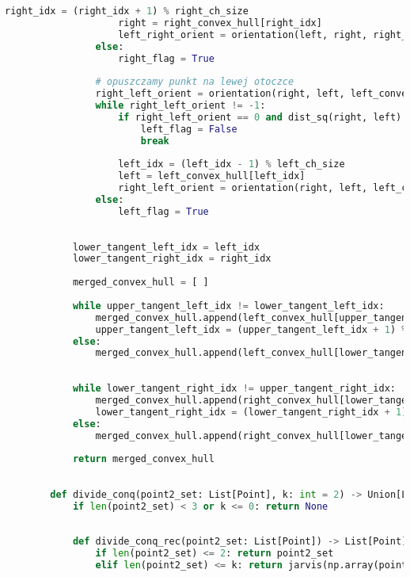 \documentclass[11pt]{article}
\theoremstyle{remark} \newtheorem{definition}{def.}
\theoremstyle{definition} \newtheorem{twierdzenie}{tw.}
\begin{document}
\begin{lstlisting}[language=Python]
                    right_idx = (right_idx + 1) % right_ch_size
                    right = right_convex_hull[right_idx]
                    left_right_orient = orientation(left, right, right_convex_hull[(right_idx + 1) % right_ch_size])
                else:
                    right_flag = True
                    
                # opuszczamy punkt na lewej otoczce
                right_left_orient = orientation(right, left, left_convex_hull[(left_idx - 1) % left_ch_size])
                while right_left_orient != -1:
                    if right_left_orient == 0 and dist_sq(right, left) >= dist_sq(right, left_convex_hull[(left_idx - 1) % left_ch_size]):
                        left_flag = False
                        break
                            
                    left_idx = (left_idx - 1) % left_ch_size
                    left = left_convex_hull[left_idx]
                    right_left_orient = orientation(right, left, left_convex_hull[(left_idx - 1) % left_ch_size])
                else:
                    left_flag = True
                    
                    
            lower_tangent_left_idx = left_idx
            lower_tangent_right_idx = right_idx
            
            merged_convex_hull = [ ]
        
            while upper_tangent_left_idx != lower_tangent_left_idx:
                merged_convex_hull.append(left_convex_hull[upper_tangent_left_idx])
                upper_tangent_left_idx = (upper_tangent_left_idx + 1) % left_ch_size
            else:
                merged_convex_hull.append(left_convex_hull[lower_tangent_left_idx])
                
                
            while lower_tangent_right_idx != upper_tangent_right_idx:
                merged_convex_hull.append(right_convex_hull[lower_tangent_right_idx])
                lower_tangent_right_idx = (lower_tangent_right_idx + 1) % right_ch_size    
            else:
                merged_convex_hull.append(right_convex_hull[lower_tangent_right_idx])
            
            return merged_convex_hull 
        
        
        def divide_conq(point2_set: List[Point], k: int = 2) -> Union[List[Point], None]:
            if len(point2_set) < 3 or k <= 0: return None     
        
            
            def divide_conq_rec(point2_set: List[Point]) -> List[Point]:
                if len(point2_set) <= 2: return point2_set
                elif len(point2_set) <= k: return jarvis(np.array(point2_set))
            

\end{lstlisting}
\end{document}
